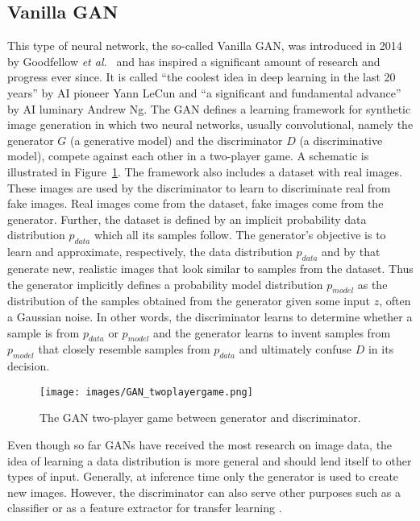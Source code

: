 \documentclass[a4paper,12pt]{report}
\begin{document}
\subsection{Vanilla GAN}\label{subsec:vanillaGan}
This type of neural network, the so-called Vanilla GAN, was introduced in 2014 by Goodfellow \textit{et al.}~\cite{1406.2661} and has inspired a significant amount of research and progress ever since. It is called ``the coolest idea in deep learning in the last 20 years'' by AI pioneer Yann LeCun and ``a significant and fundamental advance'' by AI luminary Andrew Ng. The GAN defines a learning framework for synthetic image generation in which two neural networks, usually convolutional, namely the generator $G$ (a generative model) and the discriminator $D$ (a discriminative model), compete against each other in a two-player game. A schematic is illustrated in Figure~\ref{fig:gan_learning}. The framework also includes a dataset with real images. These images are used by the discriminator to learn to discriminate real from fake images. Real images come from the dataset, fake images come from the generator. Further, the dataset is defined by an implicit probability data distribution $p_{data}$ which all its samples follow. The generator's objective is to learn and approximate, respectively, the data distribution $p_{data}$ and by that generate new, realistic images that look similar to samples from the dataset. Thus the generator implicitly defines a probability model distribution $p_{model}$ as the distribution of the samples obtained from the generator given some input $z$, often a Gaussian noise. In other words, the discriminator learns to determine whether a sample is from $p_{data}$ or $p_{model}$ and the generator learns to invent samples from $p_{model}$ that closely resemble samples from $p_{data}$ and ultimately confuse $D$ in its decision.  
\begin{figure}[ht]
\centering
\texttt{[image: images/GAN\_twoplayergame.png]}
\caption{The GAN two-player game between generator and discriminator.}
\label{fig:gan_learning}
\end{figure}

Even though so far GANs have received the most research on image data, the idea of learning a data distribution is more general and should lend itself to other types of input. Generally, at inference time only the generator is used to create new images. However, the discriminator can also serve other purposes such as a classifier \cite{ImprTechn4TrainGANs} or as a feature extractor for transfer learning \cite{SpotArtifacts}.
\end{document}
